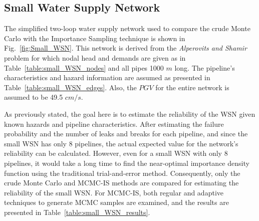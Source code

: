     
    \subsection{Small Water Supply Network}
        The simplified two-loop water supply network used to compare the crude Monte Carlo with the Importance Sampling technique is shown in Fig.~\ref{fig:Small_WSN}. This network is derived from the \textit{Alperovits and Shamir} problem \cite{alperovits_design_1977} for which nodal head and demands are given as in Table~\ref{table:small_WSN_nodes} and all pipes 1000 $m$ long. The pipeline's characteristics and hazard information are assumed as presented in Table~\ref{table:small_WSN_edges}. Also, the $PGV$ for the entire network is assumed to be 49.5 $cm/s$.%
            
            
            
            

        As previously stated, the goal here is to estimate the reliability of the WSN given known hazards and pipeline characteristics. After estimating the failure probability and the number of leaks and breaks for each pipeline, and since the small WSN has only 8 pipelines, the actual expected value for the network's reliability can be calculated. However, even for a small WSN with only 8 pipelines, it would take a long time to find the near-optimal importance density function using the traditional trial-and-error method. Consequently, only the crude Monte Carlo and MCMC-IS methods are compared for estimating the reliability of the small WSN. For MCMC-IS, both regular and adaptive techniques to generate MCMC samples are examined, and the results are presented in Table~\ref{table:small_WSN_results}. 
        
            
            
